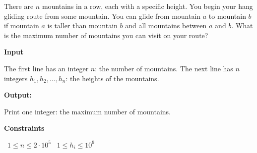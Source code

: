 There are $n$ mountains in a row, each with a specific height. You begin your hang gliding route from some mountain.
You can glide from mountain $a$ to mountain $b$ if mountain $a$ is taller than mountain $b$ and all mountains between $a$ and $b$.
What is the maximum number of mountains you can visit on your route?

\vspace{0.3cm}\noindent\textbf{Input}

The first line has an integer $n$: the number of mountains.
The next line has $n$ integers $h_1, h_2,\dots, h_n$: the heights of the mountains.

\vspace{0.3cm}\noindent\textbf{Output:}

Print one integer: the maximum number of mountains.

\vspace{0.3cm}\noindent\textbf{Constraints}

\textbullet\ $1\le n \le 2 \cdot 10^5$
\textbullet\ $1\le h_i \le 10^9$